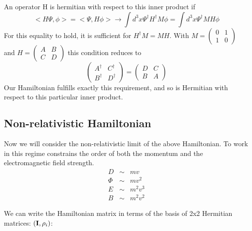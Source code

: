 An operator H is hermitian with respect to this inner product if
\[ <H\Psi, \phi> = <\Psi, H\phi> \to
		\int d^3x \Psi^\dagger H^\dagger M \phi	=	\int d^3x \Psi^\dagger M H \phi
\]
For this equality to hold, it is sufficient for $H^\dagger M = M H$.  With $M=\begin{pmatrix} 0 & 1 \\ 1 & 0 \end{pmatrix}$ and $H=\begin{pmatrix} A & B \\ C & D \end{pmatrix}$ this condition reduces to 
\[
	\begin{pmatrix} A^\dagger & C^\dagger \\ B^\dagger & D^\dagger \end{pmatrix}
	=\begin{pmatrix} D & C \\ B & A \end{pmatrix}
\]
Our Hamiltonian fulfills exactly this requirement, and so is Hermitian with respect to this particular inner product.




\subsection{Non-relativistic Hamiltonian}
Now we will consider the non-relativistic limit of the above Hamiltonian.  To work in this regime constrains the order of both the momentum and the electromagnetic field strength.
\begin{eqnarray*}
	D	&\sim&	mv	\\
	\Phi	&\sim&	mv^2	\\
	E	&\sim&	m^2v^3	\\
	B	&\sim&	m^2v^2
\end{eqnarray*}

We can write the Hamiltonian matrix in terms of the basis of 2x2 Hermitian matrices: $({\bf I}, \rho_i)$:

